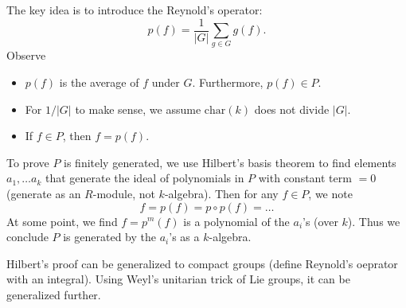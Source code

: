 The key idea is to introduce the Reynold's operator:
\[
    p(f) = \frac{1}{|G|} \sum_{g \in G} g(f).
\]
Observe
\begin{itemize}
    \item $p(f)$ is the average of $f$ under $G$. Furthermore, $p(f) \in P$.
    \item For $1/|G|$ to make sense, we assume $\text{char}(k)$ does not divide $|G|$.
    \item If $f \in P$, then $f = p(f)$.
\end{itemize}
To prove $P$ is finitely generated, we use Hilbert's basis theorem to find elements $a_1, \dots a_k$ that generate the ideal of polynomials in $P$ with constant term $ = 0$ (generate as an $R$-module, not $k$-algebra). Then for any $f \in P$, we note
\[
    f = p(f) = p \circ p(f) = \dots
\]
At some point, we find $f = p^m(f)$ is a polynomial of the $a_i$'s (over $k$). Thus we conclude $P$ is generated by the $a_i$'s as a $k$-algebra.

Hilbert's proof can be generalized to compact groups (define Reynold's oeprator with an integral). Using Weyl's unitarian trick of Lie groups, it can be generalized further.

